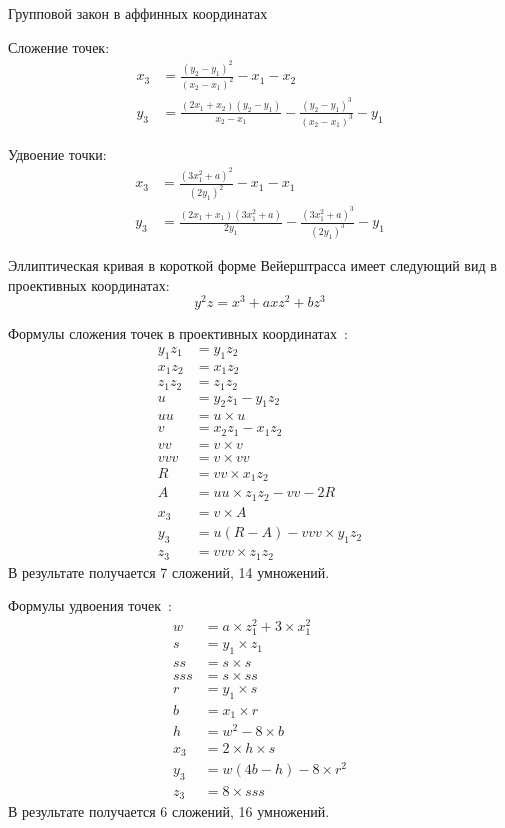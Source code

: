 Групповой закон в аффинных координатах

Сложение точек:
\begin{align*}
x_3 &= \frac{(y_2 - y_1)^2}{(x_2 - x_1)^2} - x_1 - x_2 \\
y_3 &= \frac{(2x_1 + x_2)(y_2 - y_1)}{x_2 - x_1} - \frac{(y_2 - y_1)^3}{(x_2 - x_1)^3} - y_1
\end{align*}

Удвоение точки:
\begin{align*}
x_3 &= \frac{(3x_1^2 + a)^2}{(2y_1)^2} - x_1 - x_1 \\
y_3 &= \frac{(2x_1 + x_1)(3x_1^2 + a)}{2y_1} - \frac{(3x_1^2 + a)^3}{(2y_1)^3} - y_1
\end{align*}

Эллиптическая кривая в короткой форме Вейерштрасса имеет следующий вид в проективных координатах:
\begin{equation*}
y^2z = x^3 + axz^2 + bz^3
\end{equation*}

Формулы сложения точек в проективных координатах~\cite{weierstrass-formulas}:
\begin{align*}
y_1z_1 &= y_1z_2 \\
x_1z_2 &= x_1z_2 \\
z_1z_2 &= z_1z_2 \\
u &= y_2z_1 - y_1z_2 \\
uu &= u \times u \\
v &= x_2z_1 - x_1z_2 \\
vv &= v \times v \\
vvv &= v \times vv \\
R &= vv \times x_1z_2 \\
A &= uu \times z_1z_2 - vv - 2R \\
x_3 &= v \times A \\
y_3 &= u(R - A) - vvv \times y_1z_2 \\
z_3 &= vvv \times z_1z_2
\end{align*}
В результате получается 7 сложений, 14 умножений.

Формулы удвоения точек~\cite{weierstrass-formulas}:
\begin{align*}
w &= a \times z_1^2 + 3 \times x_1^2 \\
s &= y_1 \times z_1 \\
ss &= s \times s \\
sss &= s \times ss \\
r &= y_1 \times s \\
b &= x_1 \times r \\
h &= w^2 - 8 \times b \\
x_3 &= 2 \times h \times s \\
y_3 &= w(4b - h) - 8 \times r^2 \\
z_3 &= 8 \times sss
\end{align*}
В результате получается 6 сложений, 16 умножений.

